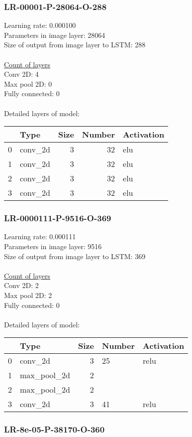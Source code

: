 \subsubsection*{LR-00001-P-28064-O-288}
Learning rate: 0.000100
\\Parameters in image layer: 28064
\\Size of output from image layer to LSTM: 288
\\\\\underline{Count of layers} 
\\Conv 2D:           4\\Max pool 2D:      0\\Fully connected:  0
\\\\Detailed layers of model: \\\begin{tabular}{rlrrl}
\hline
    & Type    &   Size &   Number & Activation   \\
\hline
  0 & conv\_2d &      3 &       32 & elu          \\
  1 & conv\_2d &      3 &       32 & elu          \\
  2 & conv\_2d &      3 &       32 & elu          \\
  3 & conv\_2d &      3 &       32 & elu          \\
\hline
\end{tabular}\subsubsection*{LR-0000111-P-9516-O-369}
Learning rate: 0.000111
\\Parameters in image layer: 9516
\\Size of output from image layer to LSTM: 369
\\\\\underline{Count of layers} 
\\Conv 2D:           2\\Max pool 2D:      2\\Fully connected:  0
\\\\Detailed layers of model: \\\begin{tabular}{rlrll}
\hline
    & Type        &   Size & Number   & Activation   \\
\hline
  0 & conv\_2d     &      3 & 25       & relu         \\
  1 & max\_pool\_2d &      2 &          &              \\
  2 & max\_pool\_2d &      2 &          &              \\
  3 & conv\_2d     &      3 & 41       & relu         \\
\hline
\end{tabular}\subsubsection*{LR-8e-05-P-38170-O-360}
